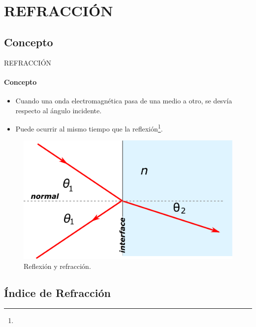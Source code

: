 \section{REFRACCIÓN}
\subsection{Concepto}

\begin{frame}{REFRACCIÓN}
  \framesubtitle{Concepto}
  \begin{itemize}
    \item Cuando una onda electromagnética pasa de una medio a otro, se desvía respecto al ángulo incidente.
    \item Puede ocurrir al mismo tiempo que la reflexión\footnote{}.
  \end{itemize}
  \begin{figure}
      \includegraphics[scale=0.4]{david/Refrac.pdf}
      \caption{Reflexión y refracción\footnotemark{}.}
  \end{figure}
  \vspace{-2cm}
\end{frame}

\subsection{Índice de Refracción}

